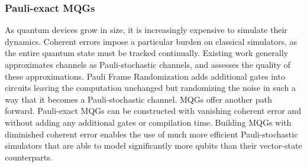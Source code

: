 \documentclass[aps,nofootinbib,pra,notitlepage,twocolumn]{revtex4-1}
\newcommand{\0}{\ensuremath{\mathbf{0}}}
\begin{document}




\subsubsection{Pauli-exact MQGs} %
\label{sub:off_diagonals}
As quantum devices grow in size, it is increasingly expensive to simulate their dynamics. Coherent errors impose a particular burden on classical simulators, as the entire quantum state must be tracked continually. Existing work generally approximates channels as Pauli-stochastic channels, and assesses the quality of these approximations\cite{Puzzuoli2014, Magesan2013}. Pauli Frame Randomization adds additional gates into circuits leaving the computation unchanged but randomizing the noise in such a way that it becomes a Pauli-stochastic channel. MQGs offer another path forward. Pauli-exact MQGs can be constructed with vanishing coherent error and without adding any additional gates or compilation time. Building MQGs with diminished coherent error enables the use of much more efficient Pauli-stochastic simulators that are able to model significantly more qubits than their vector-state counterparts. 
\end{document}
